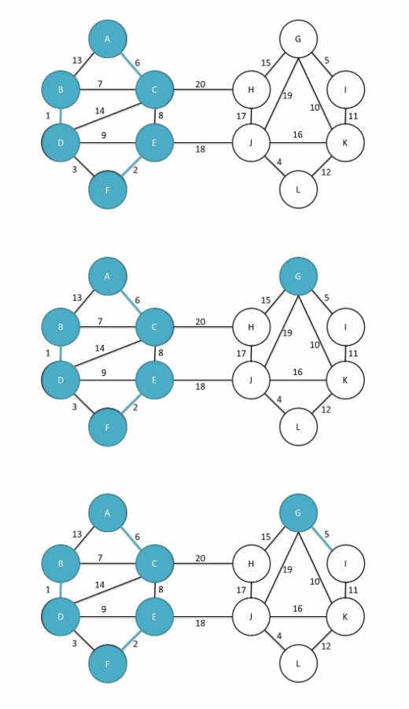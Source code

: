 \documentclass[
	11pt, %
]{beamer}
\begin{document}
\begin{frame}
    \includegraphics[width = 1\textwidth]{baruvka-example/frame_09_delay-2s.png}
\end{frame}
\begin{frame}
    \includegraphics[width = 1\textwidth]{baruvka-example/frame_10_delay-1s.png}
\end{frame}
\begin{frame}
    \includegraphics[width = 1\textwidth]{baruvka-example/frame_11_delay-1s.png}
\end{frame}
\end{document}
